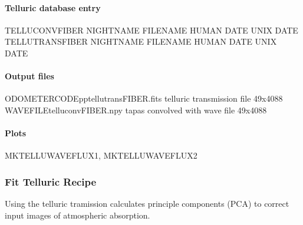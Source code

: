 \documentclass[a4paper,10pt,english]{report}
\begin{document}
\paragraph{Telluric database entry}
\label{\detokenize{user/spirou/recipes/make_tellu:telluric-database-entry}}
\begin{sphinxVerbatim}[commandchars=\\\{\}]
TELLU\PYGZus{}CONV\PYGZus{}FIBER NIGHT\PYGZus{}NAME FILENAME HUMAN DATE UNIX DATE
TELLU\PYGZus{}TRANS\PYGZus{}FIBER NIGHT\PYGZus{}NAME FILENAME HUMAN DATE UNIX DATE
\end{sphinxVerbatim}


\paragraph{Output files}
\label{\detokenize{user/spirou/recipes/make_tellu:output-files}}
\begin{sphinxVerbatim}[commandchars=\\\{\}]
ODOMETER\PYGZus{}CODE\PYGZus{}pp\PYGZus{}tellu\PYGZus{}trans\PYGZus{}FIBER.fits     telluric transmission file 49x4088
WAVEFILE\PYGZus{}tellu\PYGZus{}conv\PYGZus{}FIBER.npy               tapas convolved with wave file 49x4088
\end{sphinxVerbatim}


\paragraph{Plots}
\label{\detokenize{user/spirou/recipes/make_tellu:plots}}
\begin{sphinxVerbatim}[commandchars=\\\{\}]
MKTELLU\PYGZus{}WAVE\PYGZus{}FLUX1, MKTELLU\PYGZus{}WAVE\PYGZus{}FLUX2
\end{sphinxVerbatim}


\subsubsection{Fit Telluric Recipe}
\label{\detokenize{user/spirou/recipes/fit_tellu:fit-telluric-recipe}}\label{\detokenize{user/spirou/recipes/fit_tellu:recipes-spirou-fit-tellu}}\label{\detokenize{user/spirou/recipes/fit_tellu::doc}}
Using the telluric tramission calculates principle components (PCA) to
correct input images of atmospheric absorption.
\end{document}
